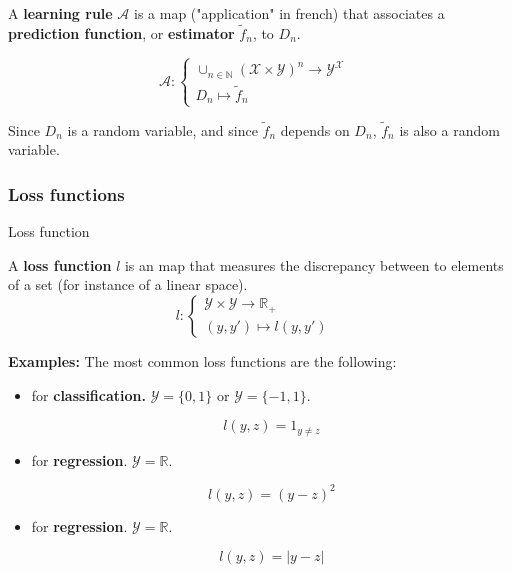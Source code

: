 \documentclass[
10pt, %
a4paper, %
oneside, %
headinclude,footinclude, %
BCOR5mm, %
]{scrartcl}
\begin{document}
A \textbf{{learning rule}} $ \mathcal{A} $ is a map ("application" in french) that associates a \textbf{{prediction function}}, or \textbf{{estimator}}  $ \tilde{f}_n$, to $D_n$.

$$
\mathcal{A}  : \left\{
    \begin{array}{ll}
	\cup_{n\in \mathbb{N} } ( \mathcal{X} \times \mathcal{Y} )^n\rightarrow \mathcal{Y}^{ \mathcal{X} } & \\
        D_n \mapsto \tilde{f}_n& 
    \end{array}
\right.
$$

Since $D_n$ is a random variable, and since $ \tilde{f}_n$ depends on $D_n$, $ \tilde{f}_n$ is also a random variable.

\subsubsection{\large\color{Periwinkle}Loss functions}

\begin{definition}{Loss function}

    A \textbf{{loss function}} $l$ is an map that measures the discrepancy between to elements of a set (for instance of a linear space).
$$
l: \left\{
    \begin{array}{ll}
	\mathcal{Y} \times \mathcal{Y} \rightarrow \mathbb{R}_+ & \\
	(y,y') \mapsto l(y,y')& 
    \end{array}
\right.
$$

\end{definition}

\textbf{{Examples:}} The most common loss functions are the following:
\begin{itemize}
    \item["0-1" loss] for \textbf{{classification.}} $ \mathcal{Y}  = \{0, 1\}$ or $ \mathcal{Y}  = \{-1, 1\}$.

	\begin{equation}
	    l(y,z) = 1_{y\neq z}
	\end{equation}
    \item[square loss] for \textbf{{regression}}. $ \mathcal{Y}  = \mathbb{R} $. 

	\begin{equation}
	    l(y,z) = (y-z)^2
	\end{equation}
    \item[absolute loss] for \textbf{{regression}}. $ \mathcal{Y}  = \mathbb{R} $. 

	\begin{equation}
	    l(y,z) = |y-z|
	\end{equation}
\end{itemize}
\end{document}
